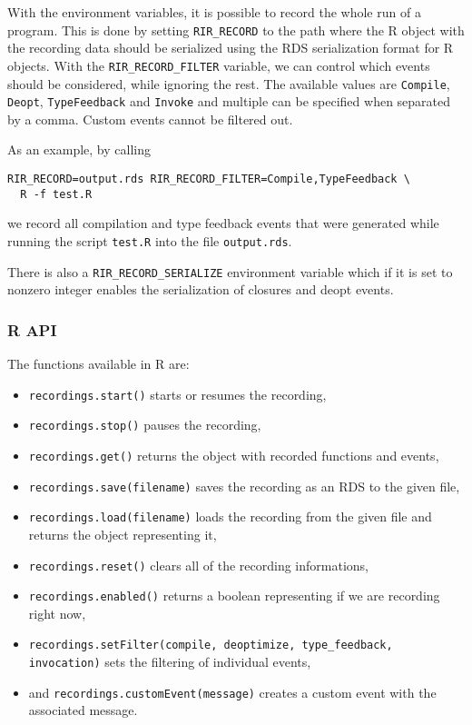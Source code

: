 With the environment variables, it is possible to record the whole run of a program. This is done by setting \texttt{RIR\_RECORD} to the path where the R object with the recording data should be serialized using the RDS serialization format for R objects\cite[1.8 Serialization Formats]{rprojectInternals}. With the \texttt{RIR\_RECORD\_FILTER} variable, we can control which events should be considered, while ignoring the rest. The available values are \texttt{Compile}, \texttt{Deopt}, \texttt{TypeFeedback} and \texttt{Invoke} and multiple can be specified when separated by a comma. Custom events cannot be filtered out.

As an example, by calling

\begin{verbatim}
RIR_RECORD=output.rds RIR_RECORD_FILTER=Compile,TypeFeedback \
  R -f test.R
\end{verbatim}

\noindent we record all compilation and type feedback events that were generated while running the script \texttt{test.R} into the file \texttt{output.rds}.

There is also a \texttt{RIR\_RECORD\_SERIALIZE} environment variable which if it is set to nonzero integer enables the serialization of closures and deopt events.

\subsubsection*{R API}

The functions available in R are\cite[documentation/recording.md]{rsh-github}:

\begin{itemize}
	\item \texttt{recordings.start()} starts or resumes the recording,
	\item \texttt{recordings.stop()} pauses the recording,
	\item \texttt{recordings.get()} returns the object with recorded functions and events,

	\item \texttt{recordings.save(filename)} saves the recording as an RDS to the given file,
	\item \texttt{recordings.load(filename)} loads the recording from the given file and returns the object representing it,

	\item \texttt{recordings.reset()} clears all of the recording informations,
	\item \texttt{recordings.enabled()} returns a boolean representing if we are recording right now,

	\item \texttt{recordings.setFilter(compile, deoptimize, type\_feedback, invocation)} sets the filtering of individual events,

	\item and \texttt{recordings.customEvent(message)} creates a custom event with the associated message.
\end{itemize}

